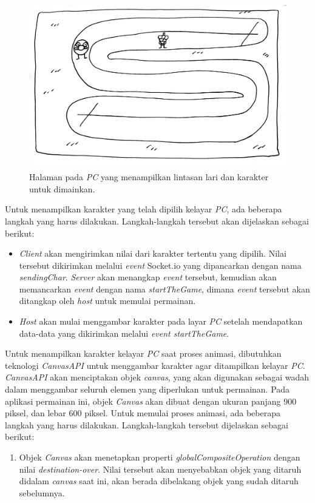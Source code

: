 \begin{enumerate}
\begin{figure}[H]
	\centering
	\includegraphics[scale=0.1]{Gambar/web5_gameplay2}
	\caption{Halaman pada \textit{PC} yang menampilkan lintasan lari dan karakter untuk dimainkan.}
	\label{fig:web5_gameplay2}
\end{figure}
	Untuk menampilkan karakter yang telah dipilih kelayar \textit{PC}, ada beberapa langkah yang harus dilakukan. Langkah-langkah tersebut akan dijelaskan sebagai berikut:
	\begin{itemize}
		\item \textit{Client} akan mengirimkan nilai dari karakter tertentu yang dipilih. Nilai tersebut dikirimkan melalui \textit{event} Socket.io yang dipancarkan dengan nama \textit{sendingChar}. \textit{Server} akan menangkap \textit{event} tersebut, kemudian akan memancarkan \textit{event} dengan nama \textit{startTheGame}, dimana \textit{event} tersebut akan ditangkap oleh \textit{host} untuk memulai permainan.
		
		\item \textit{Host} akan mulai menggambar karakter pada layar \textit{PC} setelah mendapatkan data-data yang dikirimkan melalui \textit{event startTheGame}.
		
		 
	\end{itemize}
	
	Untuk menampilkan karakter kelayar \textit{PC} saat proses animasi, dibutuhkan teknologi \textit{CanvasAPI} untuk menggambar karakter agar ditampilkan kelayar \textit{PC}. \textit{CanvasAPI} akan menciptakan objek \textit{canvas}, yang akan digunakan sebagai wadah dalam menggambar seluruh elemen yang diperlukan untuk permainan. Pada aplikasi permainan ini, objek \textit{Canvas} akan dibuat dengan ukuran panjang 900 piksel, dan lebar 600 piksel. Untuk memulai proses animasi, ada beberapa langkah yang harus dilakukan. Langkah-langkah tersebut dijelaskan sebagai berikut:
	\begin{enumerate}
		\item Objek \textit{Canvas} akan menetapkan properti \textit{globalCompositeOperation} dengan nilai \textit{destination-over}. Nilai tersebut akan menyebabkan objek yang ditaruh didalam \textit{canvas} saat ini, akan berada dibelakang objek yang sudah ditaruh sebelumnya.
		

\end{enumerate}
\end{enumerate}
